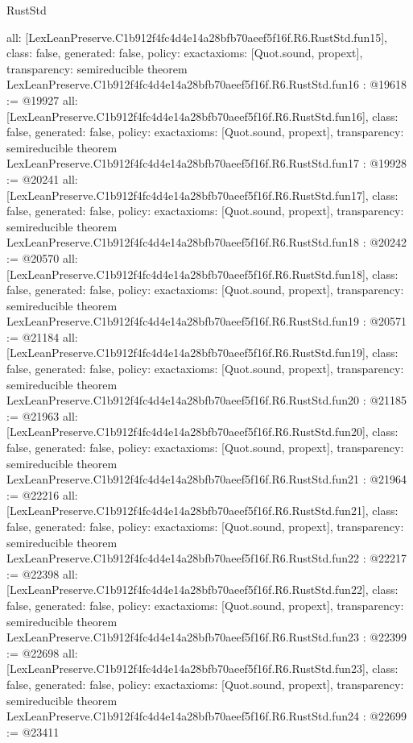 \begin{lexlean}{RustStd}
\begin{coremodule}
{  all: [LexLeanPreserve.C1b912f4fc4d4e14a28bfb70aeef5f16f.R6.RustStd.fun15],
  class: false,
  generated: false,
  policy: exact{axioms: [Quot.sound, propext]},
  transparency: semireducible
}
theorem LexLeanPreserve.C1b912f4fc4d4e14a28bfb70aeef5f16f.R6.RustStd.fun16 : @19618 := @19927 {
  all: [LexLeanPreserve.C1b912f4fc4d4e14a28bfb70aeef5f16f.R6.RustStd.fun16],
  class: false,
  generated: false,
  policy: exact{axioms: [Quot.sound, propext]},
  transparency: semireducible
}
theorem LexLeanPreserve.C1b912f4fc4d4e14a28bfb70aeef5f16f.R6.RustStd.fun17 : @19928 := @20241 {
  all: [LexLeanPreserve.C1b912f4fc4d4e14a28bfb70aeef5f16f.R6.RustStd.fun17],
  class: false,
  generated: false,
  policy: exact{axioms: [Quot.sound, propext]},
  transparency: semireducible
}
theorem LexLeanPreserve.C1b912f4fc4d4e14a28bfb70aeef5f16f.R6.RustStd.fun18 : @20242 := @20570 {
  all: [LexLeanPreserve.C1b912f4fc4d4e14a28bfb70aeef5f16f.R6.RustStd.fun18],
  class: false,
  generated: false,
  policy: exact{axioms: [Quot.sound, propext]},
  transparency: semireducible
}
theorem LexLeanPreserve.C1b912f4fc4d4e14a28bfb70aeef5f16f.R6.RustStd.fun19 : @20571 := @21184 {
  all: [LexLeanPreserve.C1b912f4fc4d4e14a28bfb70aeef5f16f.R6.RustStd.fun19],
  class: false,
  generated: false,
  policy: exact{axioms: [Quot.sound, propext]},
  transparency: semireducible
}
theorem LexLeanPreserve.C1b912f4fc4d4e14a28bfb70aeef5f16f.R6.RustStd.fun20 : @21185 := @21963 {
  all: [LexLeanPreserve.C1b912f4fc4d4e14a28bfb70aeef5f16f.R6.RustStd.fun20],
  class: false,
  generated: false,
  policy: exact{axioms: [Quot.sound, propext]},
  transparency: semireducible
}
theorem LexLeanPreserve.C1b912f4fc4d4e14a28bfb70aeef5f16f.R6.RustStd.fun21 : @21964 := @22216 {
  all: [LexLeanPreserve.C1b912f4fc4d4e14a28bfb70aeef5f16f.R6.RustStd.fun21],
  class: false,
  generated: false,
  policy: exact{axioms: [Quot.sound, propext]},
  transparency: semireducible
}
theorem LexLeanPreserve.C1b912f4fc4d4e14a28bfb70aeef5f16f.R6.RustStd.fun22 : @22217 := @22398 {
  all: [LexLeanPreserve.C1b912f4fc4d4e14a28bfb70aeef5f16f.R6.RustStd.fun22],
  class: false,
  generated: false,
  policy: exact{axioms: [Quot.sound, propext]},
  transparency: semireducible
}
theorem LexLeanPreserve.C1b912f4fc4d4e14a28bfb70aeef5f16f.R6.RustStd.fun23 : @22399 := @22698 {
  all: [LexLeanPreserve.C1b912f4fc4d4e14a28bfb70aeef5f16f.R6.RustStd.fun23],
  class: false,
  generated: false,
  policy: exact{axioms: [Quot.sound, propext]},
  transparency: semireducible
}
theorem LexLeanPreserve.C1b912f4fc4d4e14a28bfb70aeef5f16f.R6.RustStd.fun24 : @22699 := @23411 {
}
\end{coremodule}
\end{lexlean}

